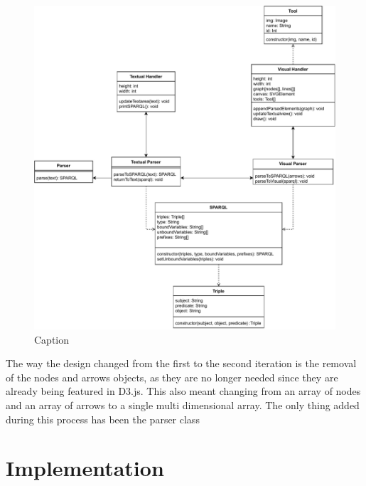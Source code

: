 \begin{figure}[H]
    \centering
    \includegraphics[angle=90,origin=c,width=1.3\textwidth]{figures/2nd_iteration_design.pdf}
    \caption{Caption}
    \label{fig:my_label}
\end{figure}

The way the design changed from the first to the second iteration is the removal of the nodes and arrows objects, as they are no longer needed since they are already being featured in D3.js. This also meant changing from an array of nodes and an array of arrows to a single multi dimensional array. The only thing added during this process has been the parser class
\section{Implementation}
